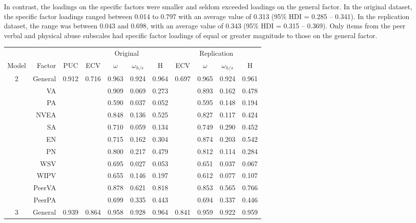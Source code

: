 \documentclass[letterpaper,man,natbib,floatsintext,longtable]{apa6}
\begin{document}
In contrast, the loadings on the specific factors were smaller and seldom exceeded loadings on the general factor. In the original dataset, the specific factor loadings ranged between 0.014 to 0.797 with an average value of 0.313 (95\% HDI = 0.285 -- 0.341). In the replication dataset, the range was between 0.043 and 0.698, with an average value of 0.343 (95\% HDI = 0.315 -- 0.369). Only items from the peer verbal and physical abuse subscales had specific factor loadings of equal or greater magnitude to those on the general factor. 

\begin{table}[h!]
\centering
\begin{tabular*}{\textwidth}{crccccccccc}
\toprule
& & & \multicolumn{4}{c}{Original} & \multicolumn{4}{c}{Replication} \\
\cmidrule(lr){4-7}\cmidrule(lr){8-11}
Model & Factor & PUC & ECV & $\omega$ & $\omega_{h/s}$ & H & ECV & $\omega$ & $\omega_{h/s}$ & H \\
\midrule
2 & General &  0.912 & 0.716 &  0.963 &   0.924 &  0.964 & 0.697 & 0.965 & 0.924 & 0.961 \\
& VA        &        &       &  0.909 &   0.069 &  0.273 &       & 0.893 & 0.162 & 0.478 \\
& PA        &        &       &  0.590 &   0.037 &  0.052 &       & 0.595 & 0.148 & 0.194 \\
& NVEA      &        &       &  0.848 &   0.136 &  0.525 &       & 0.827 & 0.117 & 0.424 \\
& SA        &        &       &  0.710 &   0.059 &  0.134 &       & 0.749 & 0.290 & 0.452 \\
& EN        &        &       &  0.715 &   0.162 &  0.304 &       & 0.874 & 0.203 & 0.542 \\
& PN        &        &       &  0.800 &   0.217 &  0.479 &       & 0.812 & 0.114 & 0.284 \\
& WSV       &        &       &  0.695 &   0.027 &  0.053 &       & 0.651 & 0.037 & 0.067 \\
& WIPV      &        &       &  0.655 &   0.146 &  0.197 &       & 0.612 & 0.077 & 0.107 \\
& PeerVA    &        &       &  0.878 &   0.621 &  0.818 &       & 0.853 & 0.565 & 0.766 \\
& PeerPA    &        &       &  0.699 &   0.335 &  0.443 &       & 0.694 & 0.337 & 0.446 \\
\midrule
3 & General &  0.939 & 0.864 &  0.958 &   0.928 &  0.964 & 0.841 & 0.959 & 0.922 & 0.959 \\

\end{tabular*}
\end{table}
\end{document}
